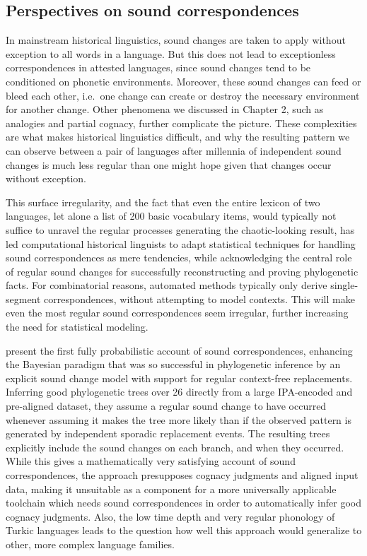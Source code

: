 \subsection{Perspectives on sound correspondences}
In mainstream historical linguistics, sound changes are taken to apply without exception to all words in a language. But this does not lead to exceptionless correspondences in attested languages, since sound changes tend to be conditioned on phonetic environments. Moreover, these sound changes can feed or bleed each other, i.e.\ one change can create or destroy the necessary environment for another change. Other phenomena we discussed in Chapter 2, such as analogies and partial cognacy, further complicate the picture. These complexities are what makes historical linguistics difficult, and why the resulting pattern we can observe between a pair of languages after millennia of independent sound changes is much less regular than one might hope given that changes occur without exception.

This surface irregularity, and the fact that even the entire lexicon of two languages, let alone a list of 200 basic vocabulary items, would typically not suffice to unravel the regular processes generating the chaotic-looking result, has led computational historical linguists to adapt statistical techniques for handling sound correspondences as mere tendencies, while acknowledging the central role of regular sound changes for successfully reconstructing and proving phylogenetic facts. For combinatorial reasons, automated methods typically only derive single-segment correspondences, without attempting to model contexts. This will make even the most regular sound correspondences seem irregular, further increasing the need for statistical modeling.

\cite{hruschka_ea_2015} present the first fully probabilistic account of sound correspondences, enhancing the Bayesian paradigm that was so successful in phylogenetic inference by an explicit sound change model with support for regular context-free replacements. Inferring good phylogenetic trees over 26  directly from a large IPA-encoded and pre-aligned dataset, they assume a regular sound change to have occurred whenever assuming it makes the tree more likely than if the observed pattern is generated by independent sporadic replacement events. The resulting trees explicitly include the sound changes on each branch, and when they occurred. While this gives a mathematically very satisfying account of sound correspondences, the approach presupposes cognacy judgments and aligned input data, making it unsuitable as a component for a more universally applicable toolchain which needs sound correspondences in order to automatically infer good cognacy judgments. Also, the low time depth and very regular phonology of Turkic languages leads to the question how well this approach would generalize to other, more complex language families.

